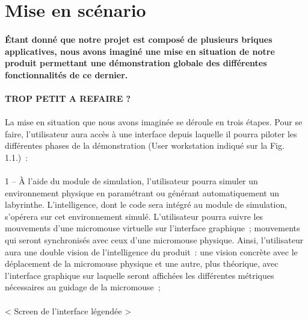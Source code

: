 \section{Mise en scénario}
\label{sec:introduction_mise_en_scenario}

\paragraph{Étant donné que notre projet est composé de plusieurs briques applicatives, nous avons imaginé une mise en situation de notre produit permettant une démonstration globale des différentes fonctionnalités de ce dernier.}

\paragraph{TROP PETIT A REFAIRE ?}




\paragraph{}
{
La mise en situation que nous avons imaginée se déroule en trois étapes. Pour se faire, l'utilisateur aura accès à une interface depuis laquelle il pourra piloter les différentes phases de la démonstration (User workstation indiqué sur la Fig. 1.1.) :
}

\paragraph{}
{
1 – À l’aide du module de simulation, l’utilisateur pourra simuler un environnement physique  en paramétrant ou générant automatiquement un labyrinthe. L’intelligence, dont le code sera intégré au module de simulation, s’opérera sur cet environnement simulé. L’utilisateur pourra suivre les mouvements d’une micromouse virtuelle sur l’interface graphique ; mouvements qui seront synchronisés avec ceux d’une micromouse physique. Ainsi, l’utilisateur aura une double vision de l’intelligence du produit : une vision concrète avec le déplacement de la micromouse physique et une autre, plus théorique, avec l’interface graphique sur laquelle seront affichées les différentes métriques nécessaires au guidage de la micromouse ;
\\
\\ < Screen de l’interface légendée >
}

